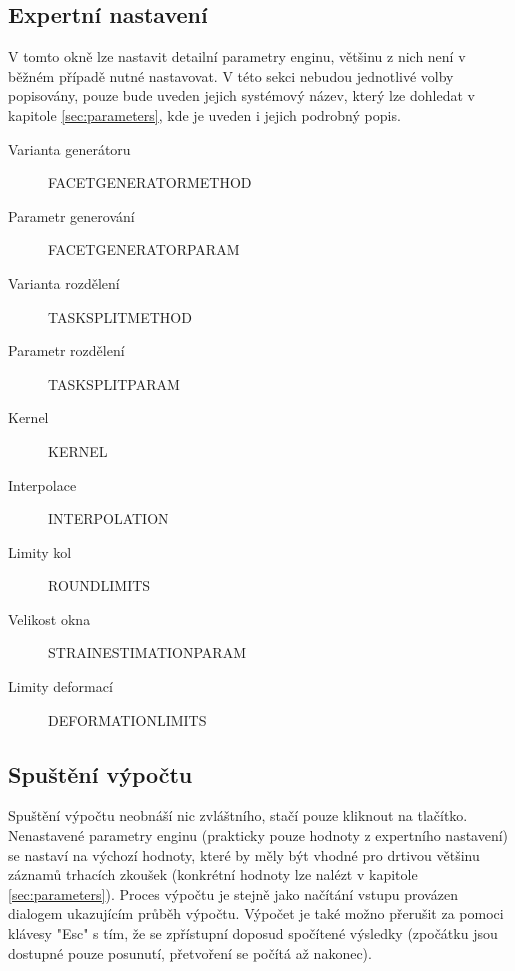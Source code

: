 \documentclass[a4paper,12pt]{article}
\begin{document}
\subsection{Expertní nastavení}
\begin{figure}[H]
\end{figure}
V tomto okně lze nastavit detailní parametry enginu, většinu z nich není v běžném případě nutné nastavovat. V této sekci nebudou jednotlivé volby popisovány, pouze bude uveden jejich systémový název, který lze dohledat v kapitole \ref{sec:parameters}, kde je uveden i jejich podrobný popis.
\begin{description}
\item[Varianta generátoru] FACET\textunderscore GENERATOR\textunderscore METHOD
\item[Parametr generování] FACET\textunderscore GENERATOR\textunderscore PARAM
\item[Varianta rozdělení] TASK\textunderscore SPLIT\textunderscore METHOD
\item[Parametr rozdělení] TASK\textunderscore SPLIT\textunderscore PARAM
\item[Kernel] KERNEL
\item[Interpolace] INTERPOLATION
\item[Limity kol] ROUND\textunderscore LIMITS
\item[Velikost okna] STRAIN\textunderscore ESTIMATION\textunderscore PARAM
\item[Limity deformací] DEFORMATION\textunderscore LIMITS 
\end{description}
\subsection{Spuštění výpočtu}
Spuštění výpočtu neobnáší nic zvláštního, stačí pouze kliknout na tlačítko. Nenastavené parametry enginu (prakticky pouze hodnoty z expertního nastavení) se nastaví na výchozí hodnoty, které by měly být vhodné pro drtivou většinu záznamů trhacích zkoušek (konkrétní hodnoty lze nalézt v kapitole \ref{sec:parameters}). Proces výpočtu je stejně jako načítání vstupu provázen dialogem ukazujícím průběh výpočtu. Výpočet je také možno přerušit za pomoci klávesy "Esc" s tím, že se zpřístupní doposud spočítené výsledky (zpočátku jsou dostupné pouze posunutí, přetvoření se počítá až nakonec).
\end{document}
